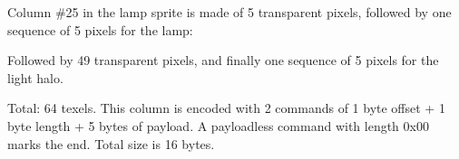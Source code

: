 \begin{minipage}{.5\textwidth}
 Column \#25 in the lamp sprite is made of 5 transparent pixels, followed by one sequence of 5 pixels for the lamp:\\
\par
{}
\par
Followed by 49 transparent pixels, and finally one sequence of 5 pixels for the light halo.\\
\par
{}
\par
Total: 64 texels. This column is encoded with 2 commands of 1 byte offset +  1 byte length + 5 bytes of payload. A payloadless command with length 0x00 marks the end. Total size is 16 bytes.\\
 \end{minipage}
\begin{minipage}{.5\textwidth}
\begin{figure}[H]
  \begin{flushright}
   \end{flushright}
\end{figure}
\end{minipage}



